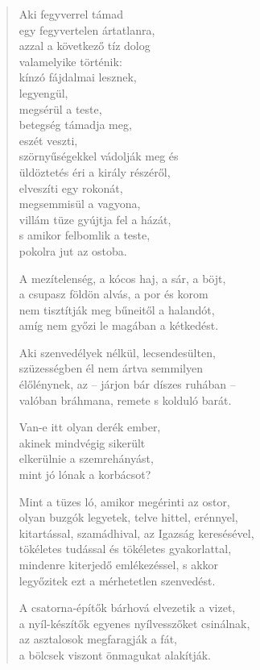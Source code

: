 \begin{verse}
 Aki fegyverrel támad\\
egy fegyvertelen ártatlanra,\\
azzal a következő tíz dolog\\
valamelyike történik:\\
kínzó fájdalmai lesznek,\\
legyengül,\\
megsérül a teste,\\
betegség támadja meg,\\
eszét veszti,\\
szörnyűségekkel vádolják meg és\\
üldöztetés éri a király részéről,\\
elveszíti egy rokonát,\\
megsemmisül a vagyona,\\
villám tüze gyújtja fel a házát,\\
s amikor felbomlik a teste,\\
pokolra jut az ostoba.

 A mezítelenség, a kócos haj, a sár, a böjt,\\
a csupasz földön alvás, a por és korom\\
nem tisztítják meg bűneitől a halandót,\\
amíg nem győzi le magában a kétkedést.

 Aki szenvedélyek nélkül, lecsendesülten,\\
szüzességben él nem ártva semmilyen\\
élőlénynek, az – járjon bár díszes ruhában –\\
valóban bráhmana, remete s kolduló barát.

 Van-e itt olyan derék ember,\\
akinek mindvégig sikerült\\
elkerülnie a szemrehányást,\\
mint jó lónak a korbácsot?

 Mint a tüzes ló, amikor megérinti az ostor,\\
olyan buzgók legyetek, telve hittel, erénnyel,\\
kitartással, szamádhival, az Igazság keresésével,\\
tökéletes tudással és tökéletes gyakorlattal,\\
mindenre kiterjedő emlékezéssel, s akkor\\
legyőzitek ezt a mérhetetlen szenvedést.

\newpage

 A csatorna-építők bárhová elvezetik a vizet,\\
a nyíl-készítők egyenes nyílvesszőket csinálnak,\\
az asztalosok megfaragják a fát,\\
a bölcsek viszont önmagukat alakítják.

\end{verse}
